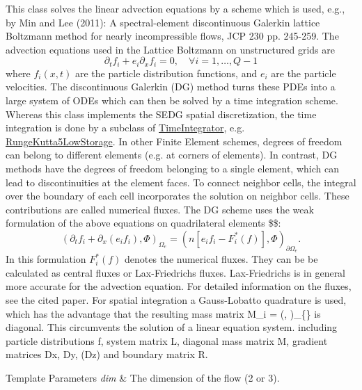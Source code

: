 This class solves the linear advection equations by a scheme which is used, e.\-g., by Min and Lee (2011)\-: A spectral-\/element discontinuous Galerkin lattice Boltzmann method for nearly incompressible flows, J\-C\-P 230 pp. 245-\/259. The advection equations used in the Lattice Boltzmann on unstructured grids are \[ \partial_t f_i + e_i \partial_x f_i = 0,\quad \forall i = 1,\dots,Q-1 \] where $ f_i(x,t) $ are the particle distribution functions, and $ e_i $ are the particle velocities. The discontinuous Galerkin (D\-G) method turns these P\-D\-Es into a large system of O\-D\-Es which can then be solved by a time integration scheme. Whereas this class implements the S\-E\-D\-G spatial discretization, the time integration is done by a subclass of \hyperlink{classnatrium_1_1TimeIntegrator}{Time\-Integrator}, e.\-g. \hyperlink{classnatrium_1_1RungeKutta5LowStorage}{Runge\-Kutta5\-Low\-Storage}. In other Finite Element schemes, degrees of freedom can belong to different elements (e.\-g. at corners of elements). In contrast, D\-G methods have the degrees of freedom belonging to a single element, which can lead to discontinuities at the element faces. To connect neighbor cells, the integral over the boundary of each cell incorporates the solution on neighbor cells. These contributions are called numerical fluxes. The D\-G scheme uses the weak formulation of the above equations on quadrilateral elements \$\$\-: \[ \left( \partial_t f_i + \partial_x (e_i f_i), \Phi \right)_{\Omega_e} = \left(n \left[ e_i f_i - F^{\ast}_{i}(f) \right], \Phi \right)_{\partial \Omega_e}. \] In this formulation $ F^{\ast}_{i}(f) $ denotes the numerical fluxes. They can be be calculated as central fluxes or Lax-\/\-Friedrichs fluxes. Lax-\/\-Friedrichs is in general more accurate for the advection equation. For detailed information on the fluxes, see the cited paper. For spatial integration a Gauss-\/\-Lobatto quadrature is used, which has the advantage that the resulting mass matrix M\-\_\-i = (, )\-\_\-\{\} is diagonal. This circumvents the solution of a linear equation system. including particle distributions f, system matrix L, diagonal mass matrix M, gradient matrices Dx, Dy, (Dz) and boundary matrix R. 


\begin{DoxyTemplParams}{Template Parameters}
{\em dim} & The dimension of the flow (2 or 3). \\
\hline
\end{DoxyTemplParams}


